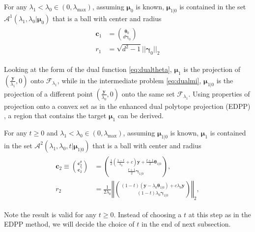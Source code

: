 \begin{theorem}
    \label{thm:1.1}
    For any $\lambda_1<\lambda_{0}\in (0,\lambda_\textrm{max})$, assuming $\boldsymbol\mu_0$ is known, $\boldsymbol\mu_{1|0}$ is contained in the set $\mathcal{A}^1(\lambda_1,\lambda_0|\boldsymbol\mu_0)$ that is a ball with center and radius
    \begin{gather}
        \begin{aligned}
            \boldsymbol c_1&=\binom{\boldsymbol\theta_0}{d\boldsymbol\gamma_0}\\
            r_1&=\sqrt{d^2-1}||\boldsymbol\gamma_0||_2
        \end{aligned}
    \end{gather}
\end{theorem}

Looking at the form of the dual function \eqref{eq:dualtheta}, $\boldsymbol\mu_1$ is the projection of $(\frac{\boldsymbol y}{\lambda_1},0)$ onto $\mathcal{F}_{\lambda_1}$, while in the intermediate problem \eqref{eq:dualmi}, $\boldsymbol\mu_{1|0}$ is the projection of a different point $(\frac{\boldsymbol y}{\lambda_0},0)$ onto the same set $\mathcal{F}_{\lambda_1}$. Using properties of projection onto a convex set as in the enhanced dual polytope projection (EDPP) \citep{wang2013lasso}, a region that contains the target $\boldsymbol\mu_1$ can be derived.

\begin{theorem}
    \label{thm:1.2}
    For any $t\geq0$ and $\lambda_1<\lambda_{0}\in (0,\lambda_\textrm{max})$, assuming $\boldsymbol\mu_{1|0}$ is known, $\boldsymbol\mu_1$ is contained in the set $\mathcal{A}^2(\lambda_1,\lambda_0,t|\boldsymbol\mu_{1|0})$ that is a ball with center and radius
    \begin{gather}
        \begin{aligned}
            \boldsymbol c_2\equiv\binom{\boldsymbol c_2^\theta}{\boldsymbol c_2^\gamma}&=\binom{\frac{1}{2}(\frac{1-t}{\lambda_0}+c)\boldsymbol y+\frac{t+1}{2}\boldsymbol\theta_{1|0}}{\frac{t+1}{2}\boldsymbol\gamma_{1|0}},\\
            r_2&=\frac{1}{2\lambda_0}\left\Vert\binom{(1-t)(\boldsymbol y-\lambda_0\boldsymbol\theta_{1|0})+c\lambda_0\boldsymbol y}{(1-t)\lambda_0\boldsymbol\gamma_{1|0}}\right\Vert_2,
        \end{aligned}
    \end{gather}
\end{theorem}

Note the result is valid for any $t\geq 0$. Instead of choosing a $t$ at this step as in the EDPP method, we will decide the choice of $t$ in the end of next subsection.

